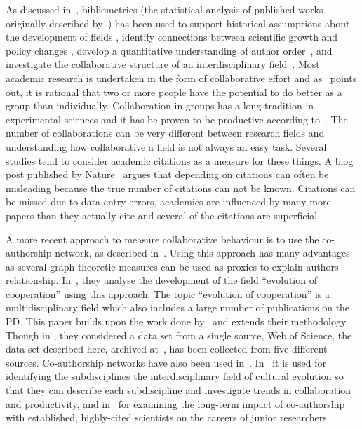 \documentclass{article}
\theoremstyle{definition}
\begin{document}
As discussed in~\cite{youngblood2018}, bibliometrics (the statistical analysis
of published works originally described by~\cite{pritchard1969}) has been used
to support historical assumptions about the development of fields
\cite{raina1998}, identify connections between scientific growth and policy
changes \cite{das2016}, develop a quantitative understanding of author
order~\cite{sekara2018}, and investigate the collaborative structure of an
interdisciplinary field~\cite{Liu2015}. Most academic research is undertaken in
the form of collaborative effort and as~\cite{Kyvik2017} points out, it is
rational that two or more people have the potential to do better as a group
than individually. Collaboration in groups has a long tradition in experimental
sciences and it has be proven to be productive according
to~\cite{Etzkowitz1992}. The number of collaborations can be very different
between research fields and understanding how collaborative a field is not
always an easy task. Several studies tend to consider academic citations as a
measure for these things. A blog post published by Nature~\cite{nature_blog}
argues that depending on citations can often be misleading because the true
number of citations can not be known. Citations can be missed due to data entry
errors, academics are influenced by many more papers than they actually cite and
several of the citations are superficial.

A more recent approach to measure collaborative behaviour is to use the
co-authorship network, as described in~\cite{Liu2015}. Using this approach has many
advantages as several graph theoretic measures can be used as proxies to explain
authors relationship. In~\cite{Liu2015}, they analyse the development of the
field ``evolution of cooperation'' using this approach. The topic ``evolution of
cooperation'' is a multidisciplinary field which also includes a large number of
publications on the PD. This paper builds upon the work done by~\cite{Liu2015}
and extends their methodology. Though in \cite{Liu2015}, they considered a data
set from a single source, Web of Science, the data set described here, archived
at~\cite{pd_data_2018}, has been collected from five different sources.
Co-authorship networks have also been used in~\cite{youngblood2018, Li2019}.
In~\cite{youngblood2018} it is used for identifying the subdisciplines the interdisciplinary
field of cultural evolution so that they can describe each subdiscipline and
investigate trends in collaboration and productivity, and in~\cite{Li2019} for examining
the long-term impact of co-authorship with established, highly-cited scientists
on the careers of junior researchers.
\end{document}
